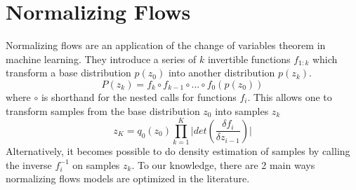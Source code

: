 
\section{Normalizing Flows}

Normalizing flows are an application of the change of variables theorem in machine learning. They introduce a series of  $k$ invertible functions $f_{1:k}$ which transform a base distribution $p(z_{0})$ into another distribution $p(z_{k})$. 
\begin{equation}
P(z_{k}) = f_{k} \circ f_{k-1} \circ ... \circ f_{0}(p(z_{0}))
\end{equation} 
where $\circ$ is shorthand for the nested calls for functions $f_{i}$. This allows one to transform samples from the base distribution $z_{0}$ into samples $z_{k}$
\begin{equation}
	z_{K} = q_{0}(z_{0}) \prod_{k=1}^{K} \bigg|det (\frac{\delta f_{i}}{\delta z_{i-1}}) \bigg|
\end{equation}
Alternatively, it becomes possible to do density estimation of samples by calling the inverse $f_{i}^{-1}$ on samples $z_{k}$. To our knowledge, there are 2 main ways normalizing flows models are optimized in the literature. 


